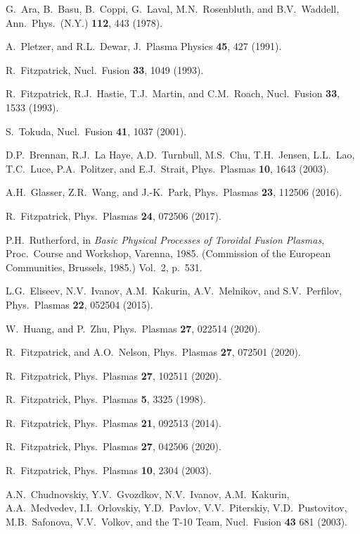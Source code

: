 \documentclass[12pt,prb,aps]{revtex4-1}
\begin{document}
\begin{thebibliography}{99}
 G.~Ara,  B.~Basu, B.~Coppi, G.~Laval, M.N.~Rosenbluth, and B.V.~Waddell, Ann.\ Phys.\ (N.Y.) {\bf 112}, 443 (1978). 

 A.~Pletzer, and R.L.~Dewar, J.\ Plasma Physics {\bf 45}, 427 (1991).

 R.~Fitzpatrick, Nucl.\ Fusion {\bf 33}, 1049 (1993).

 R.~Fitzpatrick, R.J.~Hastie, T.J.~Martin, and C.M.~Roach, Nucl.\ Fusion {\bf 33}, 1533 (1993).

 S.~Tokuda, Nucl.\ Fusion {\bf 41}, 1037 (2001).

 D.P.~Brennan, R.J.~La Haye, A.D.~Turnbull, M.S.~Chu, T.H.~Jensen, L.L.~Lao, T.C.~Luce, P.A.~Politzer, and E.J.~Strait,
Phys.\ Plasmas {\bf 10}, 1643 (2003).

 A.H.~Glasser, Z.R.~Wang, and J.-K.~Park, Phys.\ Plasmas {\bf 23}, 112506 (2016).

 R.~Fitzpatrick, Phys.\ Plasmas {\bf 24}, 072506 (2017). 

 P.H.~Rutherford, in  {\it Basic Physical Processes of
Toroidal Fusion Plasmas}, Proc.\ Course and Workshop, Varenna, 1985. (Commission of the European Communities, Brussels, 1985.) Vol.~2, p.~531.

 L.G.~Eliseev, N.V.~Ivanov, A.M.~Kakurin, A.V.~Melnikov, and S.V.~Perfilov, Phys.\ Plasmas {\bf 22}, 052504 (2015). 

 W.~Huang, and P.~Zhu, Phys.\ Plasmas {\bf 27}, 022514 (2020).

 R.~Fitzpatrick, and A.O.~Nelson, Phys.\ Plasmas {\bf 27}, 072501 (2020).

 R.~Fitzpatrick,  Phys.\ Plasmas {\bf 27}, 102511 (2020).

 R.~Fitzpatrick, Phys.\ Plasmas {\bf 5}, 3325 (1998).

 R.~Fitzpatrick, Phys.\ Plasmas {\bf 21}, 092513 (2014).

 R.~Fitzpatrick, Phys.\ Plasmas {\bf 27}, 042506 (2020).

 R.~Fitzpatrick, Phys.\ Plasmas {\bf 10}, 2304 (2003).


 A.N.~Chudnovskiy, Y.V.~Gvozdkov, N.V.~Ivanov, A.M.~Kakurin,
A.A.~Medvedev, I.I.~Orlovskiy, Y.D.~Pavlov, V.V.~Piterskiy, V.D.~Pustovitov,
M.B.~Safonova, V.V.~Volkov, and the T-10 Team, Nucl.\ Fusion {\bf 43} 681 (2003).


\end{thebibliography}
\end{document}

